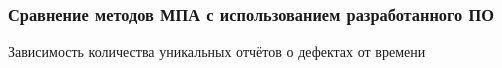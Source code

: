 \documentclass[hyperref={pdfpagelabels=false},10pt,gray]{beamer}
\begin{document}

\begin{frame}
\frametitle{Сравнение методов МПА с использованием разработанного ПО}
Зависимость количества уникальных отчётов о дефектах от времени
\begin{figure}[h]
  \begin{minipage}[h]{0.49\linewidth}
  \end{minipage}
  \hfill
  \begin{minipage}[h]{0.49\linewidth}
  \end{minipage}
\end{figure}
\end{frame}
\end{document}
